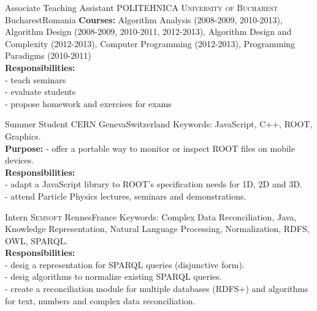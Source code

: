 \documentclass[11pt,a4paper,sans]{moderncv}
\begin{document}
{Associate Teaching Assistant}
{\textsc{POLITEHNICA University of Bucharest}}
{Bucharest}{Romania}
{ \textbf{Courses:} Algorithm Analysis (2008-2009, 2010-2013), 
Algorithm Design (2008-2009, 2010-2011, 2012-2013), 
Algorithm Design and Complexity (2012-2013), 
Computer Programming (2012-2013), 
Programming Paradigms (2010-2011)  \\ 
\textbf{Responsibilities:} \\  
- teach seminars \\ 
- evaluate students \\ 
- propose homework and exercises for exams}


{Summer Student}
{\textsc{CERN}}
{Geneva}{Switzerland}
{ Keywords: JavaScript, C++, ROOT, Graphics. \\ 
\textbf{Purpose:}  
- offer a portable way to monitor or inspect ROOT files on mobile devices. \\ 
\textbf{Responsibilities:} \\ 
- adapt a JavaScript library to ROOT's specification needs for 1D, 2D and 3D. \\ 
- attend Particle Physics lectures, seminars and demonstrations. }

{Intern}
{\textsc{Semsoft}}
{Rennes}{France}
{Keywords: Complex Data Reconciliation, Java,  Knowledge Representation, Natural Language Processing, Normalization, RDFS, OWL, SPARQL. \\ 
\textbf{Responsibilities:} \\ 
- desig a representation for SPARQL queries (disjunctive form). \\ 
- desig algorithms to normalize existing SPARQL queries. \\ 
- create a reconciliation module for multiple databases (RDFS+) and algorithms for text, numbers and complex data reconciliation.}


\end{document}
